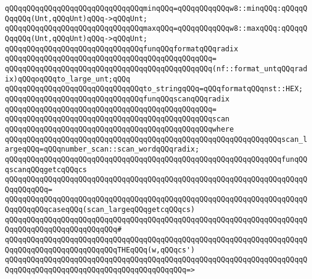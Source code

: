 \newline
\verb|qQQqqQQqqQQqqQQqqQQqqQQqqQQqqQQqminqQQq=qQQqqQQqqQQqw8::minqQQq:qQQqqQQqqQQq(Unt,qQQqUnt)qQQq->qQQqUnt;|\newline
\verb|qQQqqQQqqQQqqQQqqQQqqQQqqQQqqQQqmaxqQQq=qQQqqQQqqQQqw8::maxqQQq:qQQqqQQqqQQq(Unt,qQQqUnt)qQQq->qQQqUnt;|\newline
\newline
\verb|qQQqqQQqqQQqqQQqqQQqqQQqqQQqqQQqfunqQQqformatqQQqradix|\newline
\verb|qQQqqQQqqQQqqQQqqQQqqQQqqQQqqQQqqQQqqQQqqQQqqQQq=|\newline
\verb|qQQqqQQqqQQqqQQqqQQqqQQqqQQqqQQqqQQqqQQqqQQqqQQq(nf::format_untqQQqradix)qQQqoqQQqto_large_unt;qQQq|\newline
\newline
\verb|qQQqqQQqqQQqqQQqqQQqqQQqqQQqqQQqto_stringqQQq=qQQqformatqQQqnst::HEX;|\newline
\newline
\verb|qQQqqQQqqQQqqQQqqQQqqQQqqQQqqQQqfunqQQqscanqQQqradix|\newline
\verb|qQQqqQQqqQQqqQQqqQQqqQQqqQQqqQQqqQQqqQQqqQQqqQQq=|\newline
\verb|qQQqqQQqqQQqqQQqqQQqqQQqqQQqqQQqqQQqqQQqqQQqqQQqscan|\newline
\verb|qQQqqQQqqQQqqQQqqQQqqQQqqQQqqQQqqQQqqQQqqQQqqQQqwhere|\newline
\verb|qQQqqQQqqQQqqQQqqQQqqQQqqQQqqQQqqQQqqQQqqQQqqQQqqQQqqQQqqQQqqQQqscan_largeqQQq=qQQqnumber_scan::scan_wordqQQqradix;|\newline
\newline
\verb|qQQqqQQqqQQqqQQqqQQqqQQqqQQqqQQqqQQqqQQqqQQqqQQqqQQqqQQqqQQqqQQqfunqQQqscanqQQqgetcqQQqcs|\newline
\verb|qQQqqQQqqQQqqQQqqQQqqQQqqQQqqQQqqQQqqQQqqQQqqQQqqQQqqQQqqQQqqQQqqQQqqQQqqQQqqQQq=|\newline
\verb|qQQqqQQqqQQqqQQqqQQqqQQqqQQqqQQqqQQqqQQqqQQqqQQqqQQqqQQqqQQqqQQqqQQqqQQqqQQqqQQqcaseqQQq(scan_largeqQQqgetcqQQqcs)|\newline
\verb|qQQqqQQqqQQqqQQqqQQqqQQqqQQqqQQqqQQqqQQqqQQqqQQqqQQqqQQqqQQqqQQqqQQqqQQqqQQqqQQqqQQqqQQqqQQqqQQq#|\newline
\verb|qQQqqQQqqQQqqQQqqQQqqQQqqQQqqQQqqQQqqQQqqQQqqQQqqQQqqQQqqQQqqQQqqQQqqQQqqQQqqQQqqQQqqQQqqQQqqQQqTHEqQQq(w,qQQqcs')|\newline
\verb|qQQqqQQqqQQqqQQqqQQqqQQqqQQqqQQqqQQqqQQqqQQqqQQqqQQqqQQqqQQqqQQqqQQqqQQqqQQqqQQqqQQqqQQqqQQqqQQqqQQqqQQqqQQqqQQq=>|\newline
